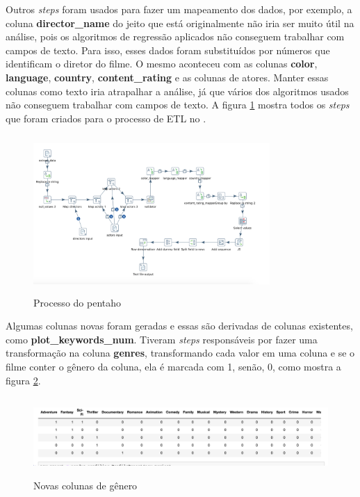 Outros \textit{steps} foram usados para fazer um mapeamento dos dados, por exemplo, a coluna \textbf{director\_name} do jeito que está originalmente não iria ser muito útil na análise, pois os algoritmos de regressão aplicados não conseguem trabalhar com campos de texto. Para isso, esses dados foram substituídos por números que identificam o diretor do filme. O mesmo aconteceu com as colunas \textbf{color}, \textbf{language}, \textbf{country}, \textbf{content\_rating} e as colunas de atores. Manter essas colunas como texto iria atrapalhar a análise, já que vários dos algoritmos usados não conseguem trabalhar com campos de texto. A figura \ref{pentahoTransformation} mostra todos os \textit{steps} que foram criados para o processo de ETL no \pdi.

\begin{figure}[H]
\centering
\includegraphics[height=6cm, width=9cm]{imagens/transformacao.png}
\caption{Processo do pentaho}
\label{pentahoTransformation}
\end{figure}

Algumas colunas novas foram geradas e essas são derivadas de colunas existentes, como \textbf{plot\_keywords\_num}. Tiveram \textit{steps} responsáveis por fazer uma transformação na coluna \textbf{genres}, transformando cada valor em uma coluna e se o filme conter o gênero da coluna, ela é marcada com 1, senão, 0, como mostra a figura \ref{newcolumns}.

\begin{figure}[H]
\centering
\includegraphics[height=3cm]{imagens/genres.png}
\caption{Novas colunas de gênero}
\label{newcolumns}
\end{figure}


